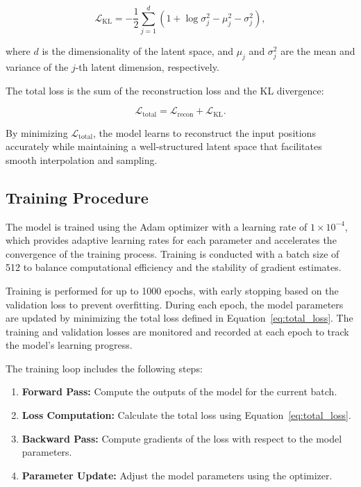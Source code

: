 \documentclass[11pt]{paper}
\begin{document}
\begin{equation}
\mathcal{L}_{\text{KL}} = -\frac{1}{2} \sum_{j=1}^{d} \left( 1 + \log\sigma_j^2 - \mu_j^2 - \sigma_j^2 \right),
\label{eq:kl_divergence}
\end{equation}

where $d$ is the dimensionality of the latent space, and $\mu_j$ and $\sigma_j^2$ are the mean and variance of the $j$-th latent dimension, respectively.

The total loss is the sum of the reconstruction loss and the KL divergence:

\begin{equation}
\mathcal{L}_{\text{total}} = \mathcal{L}_{\text{recon}} + \mathcal{L}_{\text{KL}}.
\label{eq:total_loss}
\end{equation}

By minimizing $\mathcal{L}_{\text{total}}$, the model learns to reconstruct the input positions accurately while maintaining a well-structured latent space that facilitates smooth interpolation and sampling.

\subsection{Training Procedure}

The model is trained using the Adam optimizer \cite{kingma2014adam} with a learning rate of $1 \times 10^{-4}$, which provides adaptive learning rates for each parameter and accelerates the convergence of the training process. Training is conducted with a batch size of 512 to balance computational efficiency and the stability of gradient estimates.

Training is performed for up to 1000 epochs, with early stopping based on the validation loss to prevent overfitting. During each epoch, the model parameters are updated by minimizing the total loss defined in Equation~\ref{eq:total_loss}. The training and validation losses are monitored and recorded at each epoch to track the model's learning progress.

The training loop includes the following steps:

\begin{enumerate}[label=\arabic*.]
    \item \textbf{Forward Pass:} Compute the outputs of the model for the current batch.
    \item \textbf{Loss Computation:} Calculate the total loss using Equation~\ref{eq:total_loss}.
    \item \textbf{Backward Pass:} Compute gradients of the loss with respect to the model parameters.
    \item \textbf{Parameter Update:} Adjust the model parameters using the optimizer.
\end{enumerate}
\end{document}
